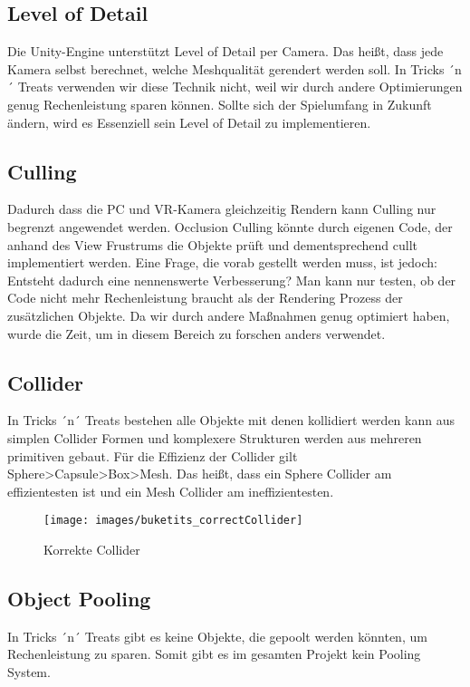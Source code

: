 \subsection{Level of Detail}
Die Unity-Engine unterstützt Level of Detail per Camera. Das heißt, dass jede Kamera selbst berechnet, welche Meshqualität gerendert werden soll. In Tricks ´n´ Treats verwenden wir diese Technik nicht, weil wir durch andere Optimierungen genug Rechenleistung sparen können. Sollte sich der Spielumfang in Zukunft ändern, wird es Essenziell sein Level of Detail zu implementieren.

\subsection{Culling}
Dadurch dass die PC und VR-Kamera gleichzeitig Rendern kann Culling nur begrenzt angewendet werden. Occlusion Culling könnte durch eigenen Code, der anhand des View Frustrums die Objekte prüft und dementsprechend cullt implementiert werden. Eine Frage, die vorab gestellt werden muss, ist jedoch: Entsteht dadurch eine nennenswerte Verbesserung? Man kann nur testen, ob der Code nicht mehr Rechenleistung braucht als der Rendering Prozess der zusätzlichen Objekte. Da wir durch andere Maßnahmen genug optimiert haben, wurde die Zeit, um in diesem Bereich zu forschen anders verwendet.

\subsection{Collider}
 In Tricks ´n´ Treats bestehen alle Objekte mit denen kollidiert werden kann aus simplen Collider Formen und komplexere Strukturen werden aus mehreren primitiven gebaut. 
 Für die Effizienz der Collider gilt Sphere>Capsule>Box>Mesh. Das heißt, dass ein Sphere Collider am effizientesten ist und ein Mesh Collider am ineffizientesten.
\begin{figure}[H]
	\centering
	\texttt{[image: images/buketits\_correctCollider]}
	\caption{Korrekte Collider}
\end{figure}

\subsection{Object Pooling}
In Tricks ´n´ Treats gibt es keine Objekte, die gepoolt werden könnten, um Rechenleistung zu sparen. Somit gibt es im gesamten Projekt kein Pooling System.


